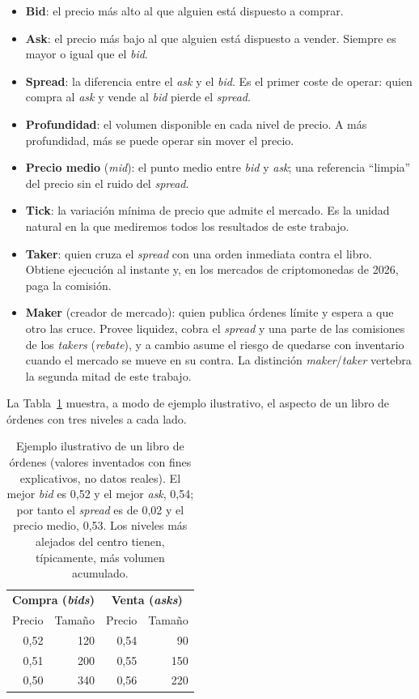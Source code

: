 \begin{itemize}
  \item \textbf{Bid}: el precio más alto al que alguien está dispuesto a comprar.
  \item \textbf{Ask}: el precio más bajo al que alguien está dispuesto a vender. Siempre
  es mayor o igual que el \emph{bid}.
  \item \textbf{Spread}: la diferencia entre el \emph{ask} y el \emph{bid}. Es el primer
  coste de operar: quien compra al \emph{ask} y vende al \emph{bid} pierde el \emph{spread}.
  \item \textbf{Profundidad}: el volumen disponible en cada nivel de precio. A más
  profundidad, más se puede operar sin mover el precio.
  \item \textbf{Precio medio} (\emph{mid}): el punto medio entre \emph{bid} y \emph{ask};
  una referencia ``limpia'' del precio sin el ruido del \emph{spread}.
  \item \textbf{Tick}: la variación mínima de precio que admite el mercado. Es la unidad
  natural en la que mediremos todos los resultados de este trabajo.
  \item \textbf{Taker}: quien cruza el \emph{spread} con una orden inmediata contra el
  libro. Obtiene ejecución al instante y, en los mercados de criptomonedas de 2026, paga
  la comisión.
  \item \textbf{Maker} (creador de mercado): quien publica órdenes límite y espera a que
  otro las cruce. Provee liquidez, cobra el \emph{spread} y una parte de las comisiones
  de los \emph{takers} (\emph{rebate}), y a cambio asume el riesgo de quedarse con
  inventario cuando el mercado se mueve en su contra. La distinción \emph{maker}/\emph{taker}
  vertebra la segunda mitad de este trabajo.
\end{itemize}

La Tabla~\ref{tab:lob} muestra, a modo de ejemplo ilustrativo, el aspecto de un libro de
órdenes con tres niveles a cada lado.

\begin{table}[h]
\centering
\caption{Ejemplo ilustrativo de un libro de órdenes (valores inventados con fines
explicativos, no datos reales). El mejor \emph{bid} es 0,52 y el mejor \emph{ask}, 0,54; por
tanto el \emph{spread} es de 0,02 y el precio medio, 0,53. Los niveles más alejados del
centro tienen, típicamente, más volumen acumulado.}
\label{tab:lob}
\begin{tabular}{rr|rr}
\toprule
\multicolumn{2}{c|}{\textbf{Compra (\emph{bids})}} & \multicolumn{2}{c}{\textbf{Venta (\emph{asks})}} \\
Precio & Tamaño & Precio & Tamaño \\
\midrule
0,52 & 120 & 0,54 & \phantom{0}90 \\
0,51 & 200 & 0,55 & 150 \\
0,50 & 340 & 0,56 & 220 \\
\bottomrule
\end{tabular}
\end{table}

